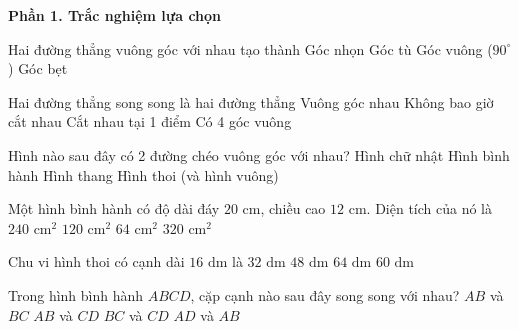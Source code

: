 \textbf{Phần 1. Trắc nghiệm lựa chọn}

\begin{ex} %
Hai đường thẳng vuông góc với nhau tạo thành
\choice
{Góc nhọn}
{Góc tù}
{\True Góc vuông ($90^\circ$)}
{Góc bẹt}
\end{ex}

\begin{ex} %
Hai đường thẳng song song là hai đường thẳng
\choice
{Vuông góc nhau}
{\True Không bao giờ cắt nhau}
{Cắt nhau tại 1 điểm}
{Có 4 góc vuông}
\end{ex}

\begin{ex} %
Hình nào sau đây có 2 đường chéo vuông góc với nhau?
\choice
{Hình chữ nhật}
{Hình bình hành}
{Hình thang}
{\True Hình thoi (và hình vuông)}
\end{ex}

\begin{ex} %
Một hình bình hành có độ dài đáy $20\text{ cm}$, chiều cao $12\text{ cm}$. Diện tích của nó là
\choice
{\True $240\text{ cm}^2$}
{$120\text{ cm}^2$}
{$64\text{ cm}^2$}
{$320\text{ cm}^2$}
\end{ex}

\begin{ex} %
Chu vi hình thoi có cạnh dài $16\text{ dm}$ là
\choice
{$32\text{ dm}$}
{$48\text{ dm}$}
{\True $64\text{ dm}$}
{$60\text{ dm}$}
\end{ex}

\begin{ex} %
Trong hình bình hành $ABCD$, cặp cạnh nào sau đây song song với nhau?
\choice
{$AB$ và $BC$}
{\True $AB$ và $CD$}
{$BC$ và $CD$}
{$AD$ và $AB$}
\end{ex}

